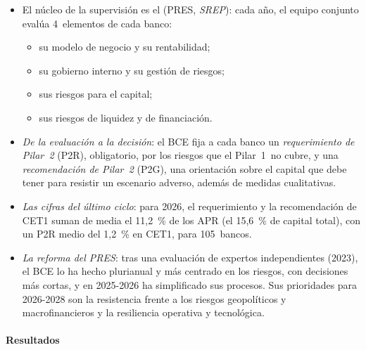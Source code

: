 \documentclass[11pt]{article}
\begin{document}
\begin{itemize}
\item El núcleo de la supervisión es el  (PRES, \emph{SREP}): cada año, el equipo conjunto evalúa 4~elementos de cada banco:
  \begin{itemize}
  \item su modelo de negocio y su rentabilidad;
  \item su gobierno interno y su gestión de riesgos;
  \item sus riesgos para el capital;
  \item sus riesgos de liquidez y de financiación.
  \end{itemize}
\item \emph{De la evaluación a la decisión}: el BCE fija a cada banco un \emph{requerimiento de Pilar~2} (P2R), obligatorio, por los riesgos que el Pilar~1~no cubre, y una \emph{recomendación de Pilar~2} (P2G), una orientación sobre el capital que debe tener para resistir un escenario adverso, además de medidas cualitativas.
\item \emph{Las cifras del último ciclo}: para 2026, el requerimiento y la recomendación de CET1 suman de media el 11,2~\% de los APR (el 15,6~\% de capital total), con un P2R medio del 1,2~\% en CET1, para 105~bancos\nocite{BCE2025SREPPrensa}.
\item \emph{La reforma del PRES}: tras una evaluación de expertos independientes (2023), el BCE lo ha hecho plurianual y más centrado en los riesgos, con decisiones más cortas, y en 2025-2026 ha simplificado sus procesos\nocite{BCE2025SimplificarSupervision}. Sus prioridades para 2026-2028 son la resistencia frente a los riesgos geopolíticos y macrofinancieros y la resiliencia operativa y tecnológica\nocite{BCE2025Prioridades}.
\end{itemize}

\paragraph{Resultados}
\end{document}
